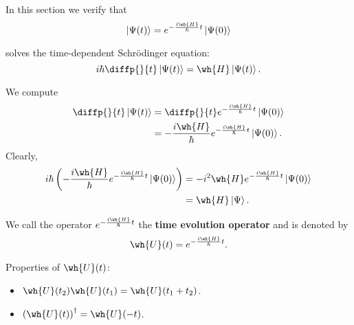 \documentclass[12pt, a4paper]{article}
\begin{document}
In this section we verify that 
\[\ket{\Psi(t)} = e^{-\frac{i\wh{H}}{\hbar}t} \ket{\Psi(0)}\]

solves the time-dependent Schrödinger equation: 
\[i\hbar \diffp{}{t}\ket{\Psi(t)} = \wh{H} \ket{\Psi(t)}.\]

We compute 
\[\begin{aligned}
    \diffp{}{t}\ket{\Psi(t)} &= \diffp{}{t} e^{-\frac{i\wh{H}}{\hbar}t} \ket{\Psi(0)} \\
    &= -\frac{i\wh{H}}{\hbar} e^{-\frac{i\wh{H}}{\hbar}t} \ket{\Psi(0)}.
\end{aligned}\]
Clearly, 
\[\begin{aligned}
    i\hbar \left( -\frac{i\wh{H}}{\hbar} e^{-\frac{i\wh{H}}{\hbar}t} \ket{\Psi(0)} \right) &=  -i^2 \wh{H}e^{-\frac{i\wh{H}}{\hbar} t} \ket{\Psi(0)} \\
    &=\wh{H} \ket{\Psi}.
\end{aligned}\]

\begin{definition}
    We call the operator \(e^{-\frac{i\wh{H}}{\hbar}t}\) the \textbf{time evolution operator} and is denoted by 
    \[\wh{U}(t)=e^{-\frac{i\wh{H}}{\hbar}t}.\]
\end{definition}

\begin{mdthm}
    Properties of \(\wh{U}(t)\):
    \begin{itemize}
        \item \(\wh{U}(t_2)\wh{U}(t_1)=\wh{U}(t_1+t_2)\).
        \item \(\left( \wh{U}(t) \right)^{\dagger} = \wh{U}(-t)\).
    \end{itemize}
\end{mdthm}
\end{document}
